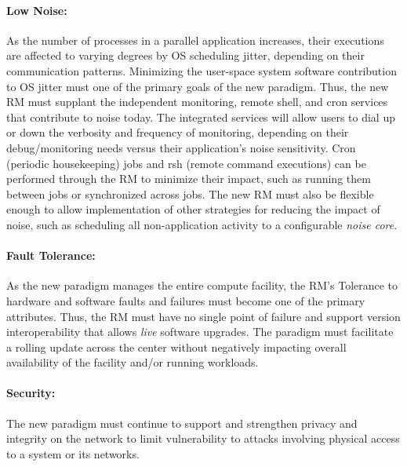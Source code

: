 \documentclass{article}
\newcommand{\ngrm}{NGRM}
\begin{document}
\paragraph{Low Noise:}
As the number of processes in a parallel application increases, 
their executions are affected to varying degrees by OS
scheduling jitter, depending on their communication patterns. Minimizing
the user-space system software contribution to OS jitter must one 
of the primary goals of the new paradigm.  Thus, the new RM must supplant
the independent monitoring, remote shell, and cron
services that contribute to noise today. The integrated services will
allow users to dial up or down the verbosity and frequency of monitoring,
depending on their debug/monitoring needs versus their application's noise
sensitivity. Cron (periodic housekeeping) jobs and rsh (remote command
executions) can be performed through the RM to minimize their impact,
such as running them between jobs or synchronized across jobs. 
The new RM must also be flexible enough to allow implementation of other
strategies for reducing the impact of noise, such as scheduling all
non-application activity to a configurable {\em noise core}.


\paragraph{Fault Tolerance:}
As the new paradigm manages the entire compute facility,
the RM's Tolerance to hardware and software faults and failures
must become one of the primary attributes.
Thus, the RM must have no single point of failure and support
version interoperability that allows {\em live} software upgrades.
The paradigm must facilitate a rolling update across the center
without negatively impacting overall availability of 
the facility and/or running workloads.


\paragraph{Security:}
The new paradigm must continue to support and strengthen privacy 
and integrity on
the network to limit vulnerability to attacks involving physical access
to a system or its networks.

%
\end{document}
